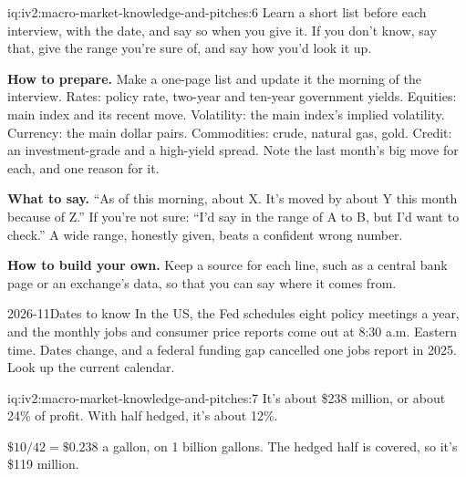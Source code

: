 \begin{solution}{iq:iv2:macro-market-knowledge-and-pitches:6}
Learn a short list before each interview, with the date, and say so when you give it. If you don't know, say that, give the range you're sure of, and say how you'd look it up.

\textbf{How to prepare.} Make a one-page list and update it the morning of the interview. Rates: policy rate, two-year and ten-year government yields. Equities: main index and its recent move. Volatility: the main index's implied volatility. Currency: the main dollar pairs. Commodities: crude, natural gas, gold. Credit: an investment-grade and a high-yield spread. Note the last month's big move for each, and one reason for it.

\textbf{What to say.} ``As of this morning, about X. It's moved by about Y this month because of Z.'' If you're not sure: ``I'd say in the range of A to B, but I'd want to check.'' A wide range, honestly given, beats a confident wrong number.

\textbf{How to build your own.} Keep a source for each line, such as a central bank page or an exchange's data, so that you can say where it comes from.

\begin{dated}{2026-11}{Dates to know}\label{dat:iv2:macro-market-knowledge-and-pitches:cal}
In the US, the Fed schedules eight policy meetings a year, and the monthly jobs and consumer price reports come out at 8:30 a.m. Eastern time. Dates change, and a federal funding gap cancelled one jobs report in 2025. Look up the current calendar.
\end{dated}

\end{solution}

\begin{solution}{iq:iv2:macro-market-knowledge-and-pitches:7}
It's about \$238 million, or about 24\% of profit. With half hedged, it's about 12\%.

$\$10/42 = \$0.238$ a gallon, on 1 billion gallons. The hedged half is covered, so it's \$119 million.

\end{solution}

